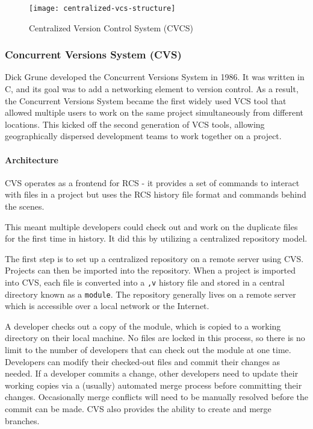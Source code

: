 \begin{figure}[htbp]
    \centering
    \texttt{[image: centralized-vcs-structure]}
    \caption{Centralized Version Control System (CVCS)}
    \label{fig:cvcs-structure}
\end{figure}

\subsubsection{Concurrent Versions System (CVS)}
Dick Grune developed the Concurrent Versions System in 1986. It was written in C, and its goal was to add a networking element to version control. As a result, the Concurrent Versions System became the first widely used VCS tool that allowed multiple users to work on the same project simultaneously from different locations. This kicked off the second generation of VCS tools, allowing geographically dispersed development teams to work together on a project.

\paragraph{Architecture}
CVS operates as a frontend for RCS - it provides a set of commands to interact with files in a project but uses the RCS history file format and commands behind the scenes.

This meant multiple developers could check out and work on the duplicate files for the first time in history. It did this by utilizing a centralized repository model.

The first step is to set up a centralized repository on a remote server using CVS. Projects can then be imported into the repository. When a project is imported into CVS, each file is converted into a \lstinline{,v} history file and stored in a central directory known as a \lstinline{module}. The repository generally lives on a remote server which is accessible over a local network or the Internet.

A developer checks out a copy of the module, which is copied to a working directory on their local machine. No files are locked in this process, so there is no limit to the number of developers that can check out the module at one time. Developers can modify their checked-out files and commit their changes as needed. If a developer commits a change, other developers need to update their working copies via a (usually) automated merge process before committing their changes. Occasionally merge conflicts will need to be manually resolved before the commit can be made. CVS also provides the ability to create and merge branches.

